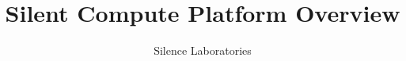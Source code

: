 \documentclass{article}
\begin{document}
\title{Silent Compute Platform Overview}

\author{Silence Laboratories}
\maketitle






\end{document}
